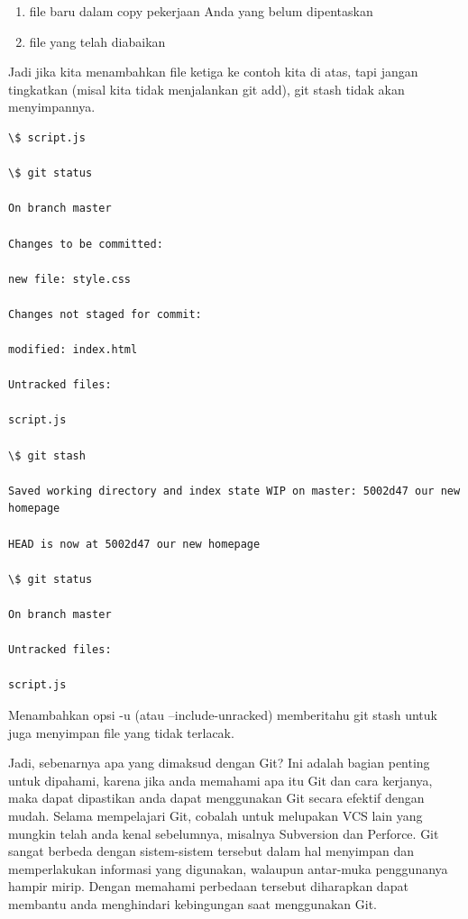 \begin{enumerate}
\item file baru dalam copy pekerjaan Anda yang belum dipentaskan
\item file yang telah diabaikan
\setcounter{numberedCntB}{\theenumi}
\end{enumerate}
Jadi jika kita menambahkan file ketiga ke contoh kita di atas, tapi 
jangan tingkatkan (misal kita tidak menjalankan git add), git stash 
tidak akan menyimpannya.\vspace{12pt} 

\begin{verbatim}
\$ script.js

\$ git status

On branch master

Changes to be committed:

new file: style.css

Changes not staged for commit:

modified: index.html

Untracked files:

script.js

\$ git stash

Saved working directory and index state WIP on master: 5002d47 our new 
homepage

HEAD is now at 5002d47 our new homepage

\$ git status

On branch master

Untracked files:

script.js

\end{verbatim}

Menambahkan opsi -u (atau --include-unracked) memberitahu git stash 
untuk juga menyimpan file yang tidak terlacak.\vspace{12pt}



Jadi, sebenarnya apa yang dimaksud dengan Git? Ini adalah bagian penting 
untuk dipahami, karena jika anda memahami apa itu Git dan cara kerjanya, 
maka dapat dipastikan anda dapat menggunakan Git secara efektif dengan 
mudah. Selama mempelajari Git, cobalah untuk melupakan VCS lain yang 
mungkin telah anda kenal sebelumnya, misalnya Subversion dan Perforce. 
Git sangat berbeda dengan sistem-sistem tersebut dalam hal menyimpan dan 
memperlakukan informasi yang digunakan, walaupun antar-muka penggunanya 
hampir mirip. Dengan memahami perbedaan tersebut diharapkan dapat 
membantu anda menghindari kebingungan saat menggunakan Git.\vspace{12pt}

